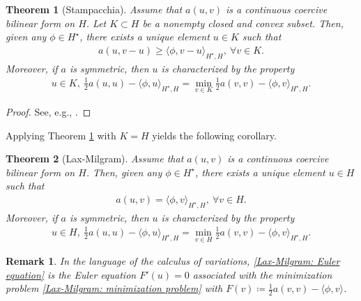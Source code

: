 \documentclass[oneside,11pt]{book}
\numberwithin{equation}{section}
\newtheorem{theorem}{Theorem}[section]
\newtheorem{remark}{Remark}[section]
\begin{document}
\begin{theorem}[Stampacchia]
    \label{Stampacchia theorem}
    Assume that $a(u,v)$ is a continuous coercive bilinear form on $H$. Let $K\subset H$ be a nonempty closed and convex subset. Then, given any $\phi\in H^\star$, there exists a unique element $u\in K$ such that
    \begin{align*}
        a(u,v - u)\ge\langle\phi,v - u\rangle_{H^\star,H},\ \forall v\in K.
    \end{align*}
    Moreover, if $a$ is symmetric, then $u$ is characterized by the property
    \begin{align*}
        u\in K,\ \frac{1}{2}a(u,u) - \langle\phi,u\rangle_{H^\star,H} = \min_{v\in K} \frac{1}{2}a(v,v) - \langle\phi,v\rangle_{H^\star,H}.
    \end{align*}
\end{theorem}

\begin{proof}
    See, e.g., \cite[pp. 138--140]{Brezis2011}.
\end{proof}
Applying Theorem \ref{Stampacchia theorem} with $K = H$ yields the following corollary.

\begin{theorem}[Lax-Milgram]
    \label{theorem: Lax-Milgram}
    Assume that $a(u,v)$ is a continuous coercive bilinear form on $H$. Then, given any $\phi\in H^\star$, there exists a unique element $u\in H$ such that
    \begin{align}
        \label{Lax-Milgram: Euler equation}
        a(u,v) = \langle\phi,v\rangle_{H^\star,H},\ \forall v\in H.
    \end{align}
    Moreover, if $a$ is symmetric, then $u$ is characterized by the property
    \begin{align}
        \label{Lax-Milgram: minimization problem}
        u\in H,\ \frac{1}{2}a(u,u) - \langle\phi,u\rangle_{H^\star,H} = \min_{v\in H} \frac{1}{2}a(v,v) - \langle\phi,v\rangle_{H^\star,H}.
    \end{align}
\end{theorem}

\begin{remark}
    In the language of the \emph{calculus of variations}, \eqref{Lax-Milgram: Euler equation} is the \emph{Euler equation} $F'(u) = 0$ associated with the minimization problem \eqref{Lax-Milgram: minimization problem} with $F(v)\coloneqq\frac{1}{2}a(v,v) - \langle\phi,v\rangle$.
\end{remark}
\end{document}
